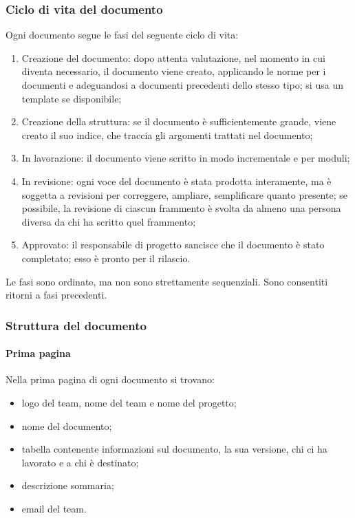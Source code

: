 		\subsubsection{Ciclo di vita del documento}
		Ogni documento segue le fasi del seguente ciclo di vita:
		\begin{enumerate}
			\item Creazione del documento: dopo attenta valutazione, nel momento in cui diventa necessario, il documento viene creato, applicando le norme per i documenti e adeguandosi a documenti precedenti dello stesso tipo; si usa un template se disponibile;
			\item Creazione della struttura: se il documento è sufficientemente grande, viene creato il suo indice, che traccia gli argomenti trattati nel documento;
			\item In lavorazione: il documento viene scritto in modo incrementale e per moduli;
			\item In revisione: ogni voce del documento è stata prodotta interamente, ma è soggetta a revisioni per correggere, ampliare, semplificare quanto presente; se possibile, la revisione di ciascun frammento è svolta da almeno una persona diversa da chi ha scritto quel frammento;
			\item Approvato: il responsabile di progetto sancisce che il documento è stato completato; esso è pronto per il rilascio.
		\end{enumerate}
		Le fasi sono ordinate, ma non sono strettamente sequenziali. Sono consentiti ritorni a fasi precedenti.
		\subsubsection{Struttura del documento}
		\paragraph{Prima pagina}
		Nella prima pagina di ogni documento si trovano:
		\begin{itemize}
			\item logo del team, nome del team e nome del progetto;
			\item nome del documento;
			\item tabella contenente informazioni sul documento, la sua versione, chi ci ha lavorato e a chi è destinato;
			\item descrizione sommaria;
			\item email del team.
		\end{itemize}
